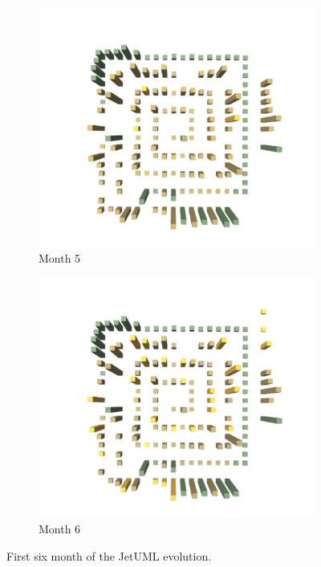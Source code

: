 \begin{figure}[h!]
    \medskip
    \begin{subfigure}{0.48\textwidth}
        \includegraphics[width=\linewidth]{JetUML_V1S5.png}
        \caption{Month 5} \label{fig:JetUML_V1S5}
    \end{subfigure}\hspace*{\fill}
    \begin{subfigure}{0.48\textwidth}
        \includegraphics[width=\linewidth]{JetUML_V1S6.png}
        \caption{Month 6} \label{fig:JetUML_V1S6}
    \end{subfigure}
    
    \caption{First six month of the JetUML evolution.} 
    \label{fig:JetUML_V1}
\end{figure}
